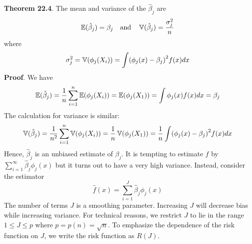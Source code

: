 \textbf{Theorem 22.4}. The mean and variance of the \(\hat{\beta}_{j}\)
are
\[
\operatorname{\mathbb{E}}(\hat{\beta}_{j}) = \beta_{j}
\quad \text{and} \quad
\operatorname{\mathbb{V}}(\hat{\beta}_{j}) = \frac{\sigma_{j}^{2}}{n}
\]
where
\[
\sigma_{j}^{2} = \VAR(\phi_{j}(X_{i})) = \int \left( \phi_{j}(x) - \beta_{j}\right)^{2}f(x) dx
\]
\textbf{Proof}. We have
\[
\operatorname{\mathbb{E}}(\hat{\beta}_{j}) = \frac{1}{n} \sum_{i=1}^{n} \operatorname{\mathbb{E}}(\phi_{j}(X_{i})) = \operatorname{\mathbb{E}}(\phi_{j}(X_{1}))  = \int \phi_{j}(x) f(x) dx = \beta_{j}
\]
The calculation for variance is similar:
\[
\VAR(\hat{\beta}_{j}) = \frac{1}{n^{2}} \sum_{i=1}^{n} \VAR(\phi_{j}(X_{i})) = \frac{1}{n} \VAR(\phi_{j}(X_{1})) = \frac{1}{n} \int \left( \phi_{j}(x) - \beta_{j}\right)^{2}f(x) dx
\]
Hence, \(\hat{\beta}_{j}\) is an unbiased estimate of \(\beta_{j}\). It is
tempting to estimate \(f\) by
\(\sum_{i=1}^{\infty} \hat{\beta}_{j} \phi_{j}(x)\) but it turns out to have a
very high variance. Instead, consider the estimator
\[
\hat{f}(x) = \sum_{i=1}^J \hat{\beta}_{j} \phi_{j}(x)
\]
The number of terms \(J\) is a smoothing parameter. Increasing \(J\)
will decrease bias while increasing variance. For technical reasons, we
restrict \(J\) to lie in the range \(1 \leq J \leq p\) where
\(p = p(n) = \sqrt{n}\). To emphasize the dependence of the risk
function on \(J\), we write the risk function as \(R(J)\).

